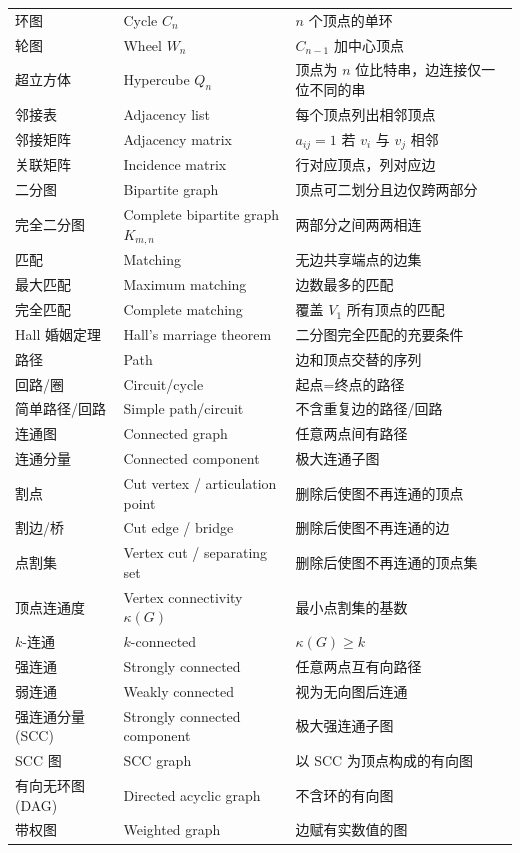 \documentclass[UTF8,11pt,a4paper]{ctexbook}   %
\theoremstyle{definition}
\begin{document}
\begin{longtable}{|p{4.8cm}|p{4.8cm}|p{4.8cm}|}
环图 & Cycle $C_n$ & $n$ 个顶点的单环 \\
轮图 & Wheel $W_n$ & $C_{n-1}$ 加中心顶点 \\
超立方体 & Hypercube $Q_n$ & 顶点为 $n$ 位比特串，边连接仅一位不同的串 \\
邻接表 & Adjacency list & 每个顶点列出相邻顶点 \\
邻接矩阵 & Adjacency matrix & $a_{ij}=1$ 若 $v_i$ 与 $v_j$ 相邻 \\
关联矩阵 & Incidence matrix & 行对应顶点，列对应边 \\
二分图 & Bipartite graph & 顶点可二划分且边仅跨两部分 \\
完全二分图 & Complete bipartite graph $K_{m,n}$ & 两部分之间两两相连 \\
匹配 & Matching & 无边共享端点的边集 \\
最大匹配 & Maximum matching & 边数最多的匹配 \\
完全匹配 & Complete matching & 覆盖 $V_1$ 所有顶点的匹配 \\
Hall 婚姻定理 & Hall's marriage theorem & 二分图完全匹配的充要条件 \\
路径 & Path & 边和顶点交替的序列 \\
回路/圈 & Circuit/cycle & 起点=终点的路径 \\
简单路径/回路 & Simple path/circuit & 不含重复边的路径/回路 \\
连通图 & Connected graph & 任意两点间有路径 \\
连通分量 & Connected component & 极大连通子图 \\
割点 & Cut vertex / articulation point & 删除后使图不再连通的顶点 \\
割边/桥 & Cut edge / bridge & 删除后使图不再连通的边 \\
点割集 & Vertex cut / separating set & 删除后使图不再连通的顶点集 \\
顶点连通度 & Vertex connectivity $\kappa(G)$ & 最小点割集的基数 \\
$k$-连通 & $k$-connected & $\kappa(G) \ge k$ \\
强连通 & Strongly connected & 任意两点互有向路径 \\
弱连通 & Weakly connected & 视为无向图后连通 \\
强连通分量 (SCC) & Strongly connected component & 极大强连通子图 \\
SCC 图 & SCC graph & 以 SCC 为顶点构成的有向图 \\
有向无环图 (DAG) & Directed acyclic graph & 不含环的有向图 \\
带权图 & Weighted graph & 边赋有实数值的图 \\

\end{longtable}
\end{document}
